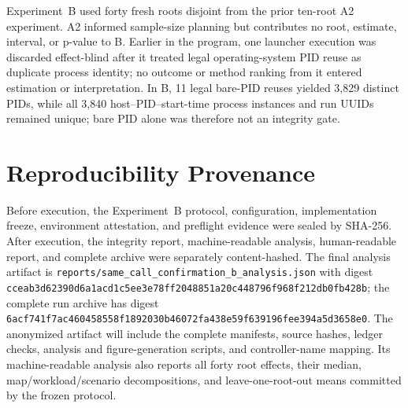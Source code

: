 \documentclass[sigconf,anonymous,review]{acmart}
\begin{document}
Experiment~B used forty fresh roots disjoint from the prior ten-root A2
experiment. A2 informed sample-size planning but contributes no root, estimate,
interval, or p-value to B. Earlier in the program, one launcher execution was
discarded effect-blind after it treated legal operating-system PID reuse as
duplicate process identity; no outcome or method ranking from it entered
estimation or interpretation. In B, 11 legal bare-PID reuses yielded 3{,}829
distinct PIDs, while all 3{,}840 host--PID--start-time process instances and run
UUIDs remained unique; bare PID alone was therefore not an integrity gate.

\section{Reproducibility Provenance}

Before execution, the Experiment~B protocol, configuration, implementation
freeze, environment attestation, and preflight evidence were sealed by
SHA-256. After execution, the integrity report, machine-readable analysis,
human-readable report, and complete archive were separately content-hashed.
The final analysis artifact is
\texttt{reports/same\_call\_confirmation\_b\_analysis.json} with digest
\texttt{cceab3d62390d6a1acd1c5ee3e78ff2048851a20c448796f968f212db0fb428b};
the complete run archive has digest
\texttt{6acf741f7ac460458558f1892030b46072fa438e59f639196fee394a5d3658e0}.
The anonymized artifact will include the complete manifests, source hashes,
ledger checks, analysis and figure-generation scripts, and controller-name
mapping. Its machine-readable analysis also reports all forty root effects,
their median, map/workload/scenario decompositions, and leave-one-root-out
means committed by the frozen protocol.
\end{document}
